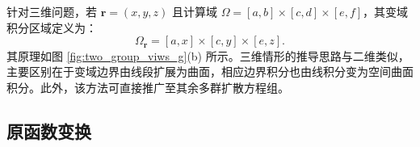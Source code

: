 \documentclass[final,3p,times,sort&compress]{elsarticle}
\begin{document}
针对三维问题，若 $\boldsymbol r=(x,y,z)$ 且计算域 $\Omega=[a,b]\times[c,d]\times[e,f]$，其变域积分区域定义为：
\begin{equation}
    \Omega_{\boldsymbol r} = [a,x]\times[c,y]\times[e,z].
    \label{eq:two_group_variable_domain_3d}
\end{equation}
其原理如图 \cref{fig:two_group_viws_g}(b) 所示。三维情形的推导思路与二维类似，主要区别在于变域边界由线段扩展为曲面，相应边界积分也由线积分变为空间曲面积分。此外，该方法可直接推广至其余多群扩散方程组。



\subsection{原函数变换}
\label{subsec:antiderivative_transform}
\end{document}
